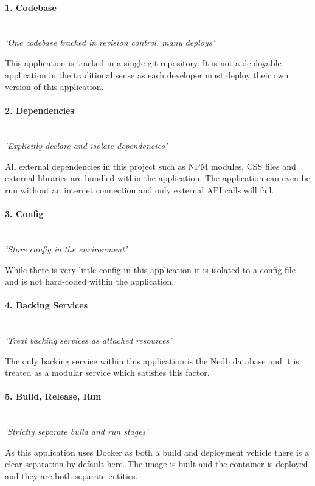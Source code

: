\paragraph{1. Codebase}\mbox{}\\
\textit{`One codebase tracked in revision control, many deploys'}

This application is tracked in a single \gls{git} repository. It is not a deployable application in the traditional sense as each developer must deploy their own version of this application.

\paragraph{2. Dependencies}\mbox{}\\
\textit{`Explicitly declare and isolate dependencies'}

All external dependencies in this project such as NPM modules, \gls{CSS} files and external libraries are bundled within the application. The application can even be run without an internet connection and only external API calls will fail.

\paragraph{3. Config}\mbox{}\\
\textit{`Store config in the environment'}

While there is very little config in this application it is isolated to a config file and is not hard-coded within the application.

\paragraph{4. Backing Services}\mbox{}\\
\textit{`Treat backing services as attached resources'}

The only backing service within this application is the Nedb database and it is treated as a modular service which satisfies this factor.

\paragraph{5. Build, Release, Run}\mbox{}\\
\textit{`Strictly separate build and run stages'}

As this application uses Docker as both a build and deployment vehicle there is a clear separation by default here. The image is built and the container is deployed and they are both separate entities.

